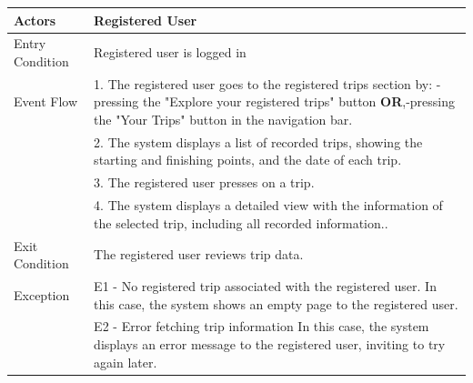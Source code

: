 \begin{enumerate}[label=\textbf{[UC\arabic*]}]
\begin{center}
\begin{tabular}{|p{4cm}|p{11cm}|}
                Actors & Registered User \\
                \hline
                Entry Condition & Registered user is logged in \\
                \hline
                Event Flow & 1. The registered user goes to the registered trips section by: \newline -pressing the "Explore your registered trips" button \textbf{OR},\newline -pressing the "Your Trips" button in the navigation bar.\\
                & 2. The system displays a list of recorded trips, showing the starting and finishing points, and the date of each trip. \\
                & 3. The registered user presses on a trip. \\
                & 4. The system displays a detailed view with the information of the selected trip, including all recorded information.. \\
                \hline
                Exit Condition & The registered user reviews trip data. \\
                \hline
                Exception & E1 - No registered trip associated with the registered user. \newline In this case, the system shows an empty page to the registered user.\\
                 & E2 - Error fetching trip information \newline In this case, the system displays an error message to the registered user, inviting to try again later.\\
                \hline
            \end{tabular}
        \end{center} 



\end{enumerate}
